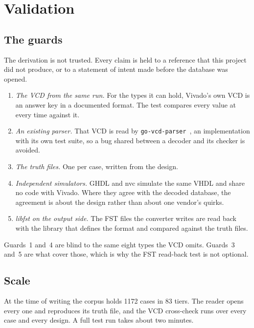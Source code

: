 \section{Validation}
\label{sec:validation}

\subsection{The guards}

The derivation is not trusted. Every claim is held to a reference that
this project did not produce, or to a statement of intent made before
the database was opened.

\begin{enumerate}
  \item \emph{The VCD from the same run.} For the types it can hold,
        Vivado's own VCD is an answer key in a documented format. The
        test compares every value at every time against it.
  \item \emph{An existing parser.} That VCD is read by
        \texttt{go-vcd-parser}~\cite{govcd}, an implementation with
        its own test suite, so a bug shared between a decoder and its
        checker is avoided.
  \item \emph{The truth files.} One per case, written from the design.
  \item \emph{Independent simulators.} GHDL and nvc simulate the same
        VHDL and share no code with Vivado. Where they agree with the
        decoded database, the agreement is about the design rather
        than about one vendor's quirks.
  \item \emph{libfst on the output side.} The FST files the converter
        writes are read back with the library that defines the format
        and compared against the truth files.
\end{enumerate}

Guards~1 and~4 are blind to the same eight types the VCD omits.
Guards~3 and~5 are what cover those, which is why the FST read-back
test is not optional.

\subsection{Scale}

At the time of writing the corpus holds 1172 cases in 83 tiers. The
reader opens every one and reproduces its truth file, and the VCD
cross-check runs over every case and every design. A full test run
takes about two minutes.


